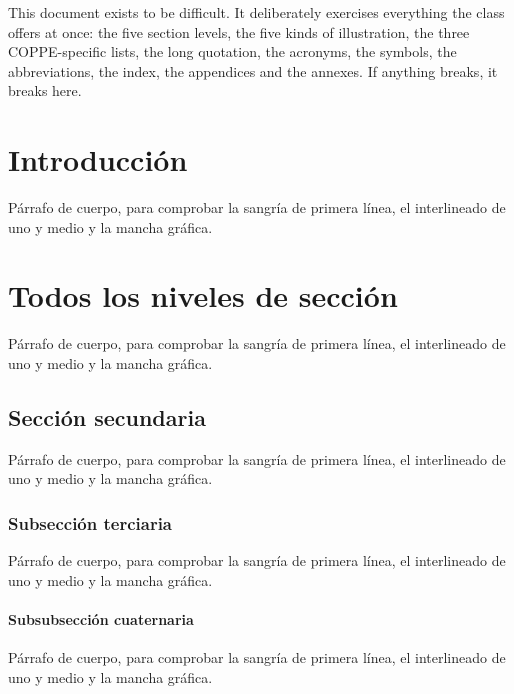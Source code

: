 \documentclass[dscexam,spanish,pdfa,coorientador,doublespacing,rascunhoficha]{ufrj}
\begin{document}
  \begin{foreignabstract}
  This document exists to be difficult. It deliberately exercises everything the class offers at once: the five section levels, the five kinds of illustration, the three COPPE-specific lists, the long quotation, the acronyms, the symbols, the abbreviations, the index, the appendices and the annexes. If anything breaks, it breaks here.
  \end{foreignabstract}

  \begin{abstract}
  Este documento existe para ser difícil. Ejercita a propósito y al mismo tiempo todo lo que ofrece la clase: los cinco niveles de sección, los cinco tipos de ilustración, las tres listas propias de la COPPE, la cita larga, las siglas, los símbolos, las abreviaturas, el índice, los apéndices y los anexos. Si algo se rompe, se rompe aquí.
  \end{abstract}

  \listoffigures
  \listofquadros
  \listofprogramas
  \listofalgorithms
  \listoftables
  \printloabbreviations
  \printlosymbols
  \tableofcontents

  \mainmatter
  \chapter{Introducción}\label{cap:intro}
  Párrafo de cuerpo, para comprobar la sangría de primera línea, el interlineado de uno y medio y la mancha gráfica.

  \chapter{Todos los niveles de sección}
  Párrafo de cuerpo, para comprobar la sangría de primera línea, el interlineado de uno y medio y la mancha gráfica.
  \section{Sección secundaria}
  Párrafo de cuerpo, para comprobar la sangría de primera línea, el interlineado de uno y medio y la mancha gráfica.
  \subsection{Subsección terciaria}
  Párrafo de cuerpo, para comprobar la sangría de primera línea, el interlineado de uno y medio y la mancha gráfica.
  \subsubsection{Subsubsección cuaternaria}
  Párrafo de cuerpo, para comprobar la sangría de primera línea, el interlineado de uno y medio y la mancha gráfica.
\end{document}
